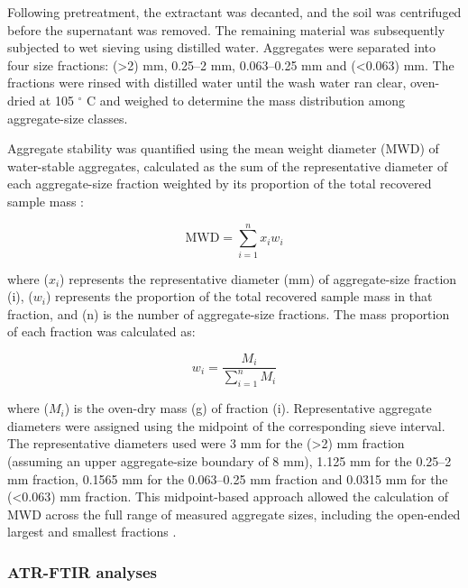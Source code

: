 \documentclass[preprint,12pt]{elsarticle}
\begin{document}
Following pretreatment, the extractant was decanted, and the soil was centrifuged before the supernatant was removed. The remaining material was subsequently subjected to wet sieving using distilled water. Aggregates were separated into four size fractions: (>2) mm, 0.25--2 mm, 0.063--0.25 mm and (<0.063) mm. The fractions were rinsed with distilled water until the wash water ran clear, oven-dried at 105 $^\circ$ C and weighed to determine the mass distribution among aggregate-size classes.

Aggregate stability was quantified using the mean weight diameter (MWD) of water-stable aggregates, calculated as the sum of the representative diameter of each aggregate-size fraction weighted by its proportion of the total recovered sample mass \citep{Abiven2009,KemperRosenau2018,Franzluebbers2022,Jimenez2025}:

\begin{equation}
    \mathrm{MWD} =
    \sum_{i=1}^{n} x_i w_i
    \label{eq:mwd}
\end{equation}
  
where ($x_i$) represents the representative diameter (mm) of aggregate-size fraction (i), ($w_i$) represents the proportion of the total recovered sample mass in that fraction, and (n) is the number of aggregate-size fractions. The mass proportion of each fraction was calculated as:
  
\begin{equation}
    w_i =
    \frac{M_i}{\sum_{i=1}^{n} M_i}
    \label{eq:mass_proportion}
\end{equation}

where ($M_i$) is the oven-dry mass (g) of fraction (i). Representative aggregate diameters were assigned using the midpoint of the corresponding sieve interval. The representative diameters used were 3 mm for the (>2) mm fraction (assuming an upper aggregate-size boundary of 8 mm), 1.125 mm for the 0.25--2 mm fraction, 0.1565 mm for the 0.063--0.25 mm fraction and 0.0315 mm for the (<0.063) mm fraction. This midpoint-based approach allowed the calculation of MWD across the full range of measured aggregate sizes, including the open-ended largest and smallest fractions \citep{Franzluebbers2022,Jimenez2025}.

\subsubsection{ATR-FTIR analyses}
\end{document}
